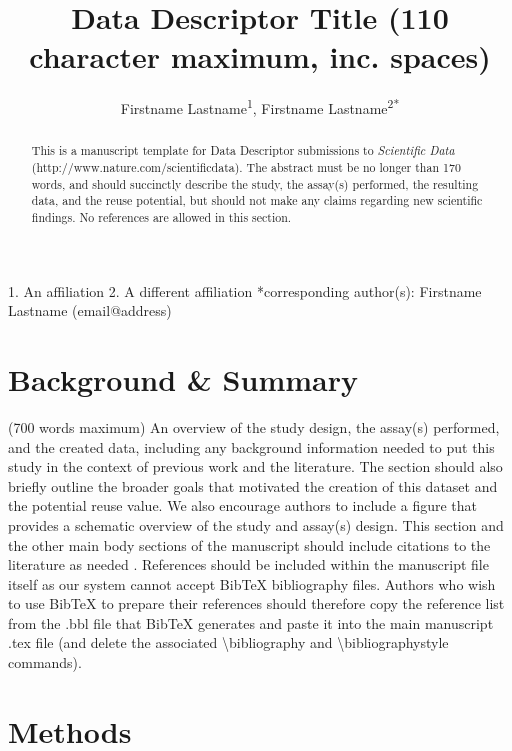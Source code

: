 \documentclass[english]{article}
\begin{document}
\title{Data Descriptor Title (110 character maximum, inc. spaces)}

\author{Firstname Lastname\textsuperscript{1}, Firstname
Lastname\textsuperscript{2{*}}}

\maketitle
\thispagestyle{fancy}

1. An affiliation 2. A different affiliation {*}corresponding author(s):
Firstname Lastname (email@address)
\begin{abstract}
This is a manuscript template for Data Descriptor submissions to \emph{Scientific
Data} (http://www.nature.com/scientificdata). The abstract must be
no longer than 170 words, and should succinctly describe the study,
the assay(s) performed, the resulting data, and the reuse potential,
but should not make any claims regarding new scientific findings.
No references are allowed in this section. 
\end{abstract}

\section*{Background \& Summary}

(700 words maximum) An overview of the study design, the assay(s)
performed, and the created data, including any background information
needed to put this study in the context of previous work and the literature.
The section should also briefly outline the broader goals that motivated
the creation of this dataset and the potential reuse value. We also
encourage authors to include a figure that provides a schematic overview
of the study and assay(s) design. This section and the other main
body sections of the manuscript should include citations to the literature
as needed \cite{cite1, cite2}. References should be included within the 
manuscript file itself as our system cannot accept BibTeX bibliography files. 
Authors who wish to use BibTeX to prepare their references should therefore 
copy the reference list from the .bbl file that BibTeX generates and paste it 
into the main manuscript .tex file (and delete the associated 
\textbackslash{}bibliography and \textbackslash{}bibliographystyle commands).


\section*{Methods}
\end{document}
